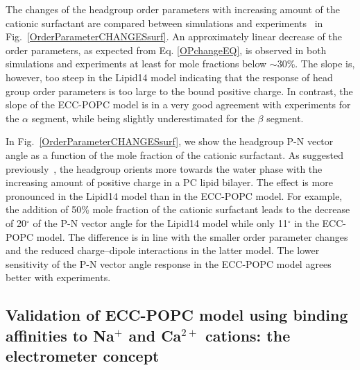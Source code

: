 \documentclass[aip,jcp,twocolumn]{revtex4}
\begin{document}
The changes of the headgroup order parameters with increasing amount of the cationic surfactant are compared between simulations and experiments~\cite{scherer89} in Fig.~\ref{OrderParameterCHANGESsurf}. An approximately linear decrease of the order parameters, as expected from Eq. \ref{OPchangeEQ}, is observed in both simulations and experiments at least for mole fractions below $\sim$30\%. The slope is, however, too steep in the Lipid14 model indicating that the response of head group order parameters is too large to the bound positive charge. In contrast, the slope of the ECC-POPC model is in a very good agreement with experiments for the $\alpha$ segment, while being slightly underestimated for the $\beta$ segment.

In Fig.~\ref{OrderParameterCHANGESsurf}, we show the headgroup P-N vector angle as a function of the mole fraction of the cationic surfactant. As suggested previously~\cite{seelig87}, the headgroup orients more towards the water phase with the increasing amount of positive charge in a PC lipid bilayer. The effect is more pronounced in the Lipid14 model than in the ECC-POPC model.   For example, the addition of 50\% mole fraction of the cationic surfactant leads to the decrease of 20$^{\circ}$ of the P-N vector angle for the Lipid14 model while only 11$^{\circ}$ in the ECC-POPC model. The difference is in line with the smaller order parameter changes and the reduced charge--dipole interactions in the latter model. The lower sensitivity of the P-N vector angle response in the ECC-POPC model agrees better with experiments.


\subsection{Validation of ECC-POPC model using binding affinities to Na$^+$ and Ca$^{2+}$ cations: the electrometer concept}
\end{document}
